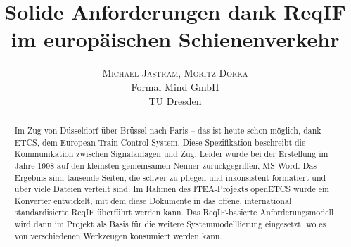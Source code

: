 \documentclass[twoside]{article}
\title{\vspace{-15mm}%
	\fontsize{24pt}{10pt}\selectfont
	\textbf{Solide Anforderungen dank ReqIF im europäischen Schienenverkehr}
	}
\author{%
	\large
	\textsc{Michael Jastram, Moritz Dorka} \\[2mm]
	\normalsize	Formal Mind GmbH \\
	\normalsize	TU Dresden
	\vspace{-5mm}
	}
\date{}
\begin{document}
\maketitle
\thispagestyle{fancy}

\begin{abstract}
\noindent Im Zug von Düsseldorf über Brüssel nach Paris – das ist heute schon möglich, dank ETCS, dem European Train Control System.  Diese Spezifikation beschreibt die Kommunikation zwischen Signalanlagen und Zug. Leider wurde bei der Erstellung im Jahre 1998 auf den kleinsten gemeinsamen Nenner zurückgegriffen, MS Word. Das Ergebnis sind tausende Seiten, die schwer zu pflegen und inkonsistent formatiert und über viele Dateien verteilt sind.  Im Rahmen des ITEA-Projekts openETCS wurde ein Konverter entwickelt, mit dem diese Dokumente in das offene, international standardisierte ReqIF überführt werden kann.  Das ReqIF-basierte Anforderungsmodell wird dann im Projekt als Basis für die weitere Systemmodelllierung eingesetzt, wo es von verschiedenen Werkzeugen konsumiert werden kann.
\end{abstract}
	
\end{document}
